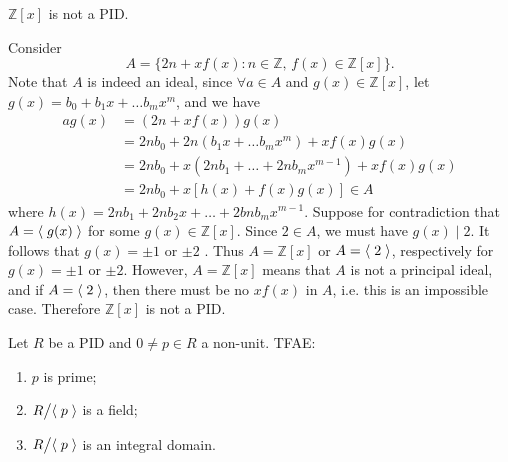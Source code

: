 \begin{eg}
  $\mathbb{Z}[x]$ is not a PID.

  Consider
  \begin{equation*}
    A = \{ 2n + xf(x) : n \in \mathbb{Z} , \, f(x) \in \mathbb{Z}[x] \}.
  \end{equation*}
  Note that $A$ is indeed an ideal, since $\forall a \in A$ and $g(x) \in \mathbb{Z}[x]$, let $g(x) = b_0 + b_1 x + \hdots b_m x^m$, and we have
  \begin{align*}
    ag(x) &= (2n + xf(x)) g(x) \\
          &= 2nb_0 + 2n\left( b_1x + \hdots b_mx^m \right) + x f(x) g(x) \\
          &= 2nb_0 + x( 2nb_1 + \hdots + 2nb_mx^{m - 1} ) + x f(x) g(x) \\
          &= 2nb_0 + x[ h(x) + f(x) g(x) ] \in A
  \end{align*}
  where $h(x) = 2nb_1 + 2nb_2 x + \hdots + 2bnb_m x^{m - 1}$. Suppose for contradiction that $A = \langle \; g(x) \; \rangle$  for some $g(x) \in \mathbb{Z}[x]$. Since $2 \in A$, we must have $g(x) \mid 2$. It follows that $g(x) = \pm 1$ or $\pm 2$ . Thus $A = \mathbb{Z}[x]$ or $A = \langle \; 2 \; \rangle$, respectively for $g(x) = \pm 1$ or $\pm 2$. However, $A = \mathbb{Z}[x]$ means that $A$ is not a principal ideal, and if $A = \langle \; 2 \; \rangle$, then there must be no $x f(x)$ in $A$, i.e. this is an impossible case. Therefore $\mathbb{Z}[x]$ is not a PID.
\end{eg}

\begin{thm}
\label{thm:quotient_over_a_pid}
  Let $R$ be a PID and $0 \neq p \in R$ a non-unit. TFAE:
  \begin{enumerate}
    \item $p$ is prime;
    \item $R \big/ \langle \; p \; \rangle$ is a field;
    \item $R \big/ \langle \; p \; \rangle$ is an integral domain.
  \end{enumerate}
\end{thm}

